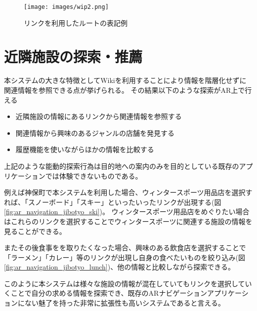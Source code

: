\begin{figure}[h]
  \centering
  \texttt{[image: images/wip2.png]}
  \caption{リンクを利用したルートの表記例} \label{fig:ar_navigation_ad}
\end{figure}

\section{近隣施設の探索・推薦}

本システムの大きな特徴としてWikiを利用することにより情報を階層化せずに関連情報を参照できる点が挙げられる。
その結果以下のような探索がAR上で行える
\begin{itemize}
  \item 近隣施設の情報にあるリンクから関連情報を参照する
  \item 関連情報から興味のあるジャンルの店舗を発見する
  \item 履歴機能を使いながらほかの情報を比較する
\end{itemize}
上記のような能動的探索行為は目的地への案内のみを目的としている既存のアプリケーションでは体験できないものである。

例えば神保町で本システムを利用した場合、ウィンタースポーツ用品店を選択すれば、「スノーボード」「スキー」といったいったリンクが出現する(図\ref{fig:ar_navigation_jibotyo_ski})。
ウィンタースポーツ用品店をめぐりたい場合はこれらのリンクを選択することでウィンタースポーツに関連する施設の情報を見ることができる。

またその後食事をを取りたくなった場合、興味のある飲食店を選択することで「ラーメン」「カレー」等のリンクが出現し自身の食べたいものを絞り込み(図\ref{fig:ar_navigation_jibotyo_lunch})、他の情報と比較しながら探索できる。

このように本システムは様々な施設の情報が混在していてもリンクを選択していくことで自分の求める情報を探索でき、既存のARナビゲーションアプリケーションにない魅了を持った非常に拡張性も高いシステムであると言える。


